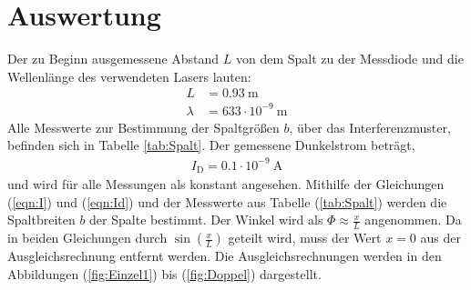 \section{Auswertung}
\label{sec:Auswertung}

Der zu Beginn ausgemessene Abstand $L$ von dem Spalt zu der Messdiode und die Wellenlänge des verwendeten Lasers lauten:
\begin{align*}
  L &= 0.93 \ \text{m} \\
  \lambda &= 633 \cdot 10^{-9} \ \text{m}
\end{align*}
Alle Messwerte zur Bestimmung der Spaltgrößen $b$, über das Interferenzmuster, befinden sich in Tabelle \ref{tab:Spalt}. Der gemessene Dunkelstrom beträgt,
\begin{align*}
  I_\text{D} = 0.1 \cdot 10^{-9} \ \text{A}
\end{align*}
und wird für alle Messungen als konstant angesehen. Mithilfe der Gleichungen (\ref{eqn:I}) und (\ref{eqn:Id}) und der Messwerte aus Tabelle (\ref{tab:Spalt}) werden die Spaltbreiten $b$ der Spalte bestimmt. Der Winkel wird als $\Phi \approx \frac{x}{L}$ angenommen. Da in beiden Gleichungen durch $\sin\left(\frac{x}{L} \right)$ geteilt wird, muss der Wert $x = 0$ aus der Ausgleichsrechnung entfernt werden. Die Ausgleichsrechnungen werden in den Abbildungen (\ref{fig:Einzel1}) bis (\ref{fig:Doppel}) dargestellt.

